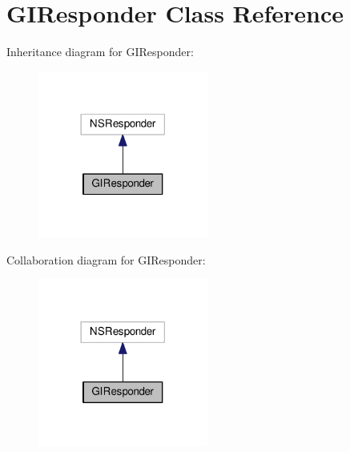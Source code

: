 \hypertarget{interfaceGIResponder}{}\section{G\+I\+Responder Class Reference}
\label{interfaceGIResponder}


Inheritance diagram for G\+I\+Responder\+:
\nopagebreak
\begin{figure}[H]
\begin{center}
\leavevmode
\includegraphics[width=158pt]{interfaceGIResponder__inherit__graph}
\end{center}
\end{figure}


Collaboration diagram for G\+I\+Responder\+:
\nopagebreak
\begin{figure}[H]
\begin{center}
\leavevmode
\includegraphics[width=158pt]{interfaceGIResponder__coll__graph}
\end{center}
\end{figure}
